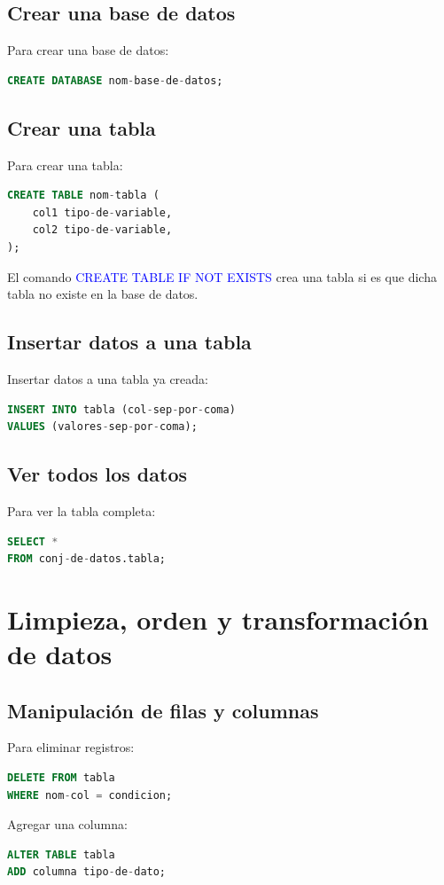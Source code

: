 \documentclass[a4paper, 12pt]{book}
\begin{document}
\subsection{Crear una base de datos}
Para crear una base de datos:
\begin{lstlisting}[language=SQL]
CREATE DATABASE nom-base-de-datos;
\end{lstlisting}
\subsection{Crear una tabla}
Para crear una tabla:
\begin{lstlisting}[language=SQL]
CREATE TABLE nom-tabla (
    col1 tipo-de-variable,
    col2 tipo-de-variable,
);
\end{lstlisting}
El comando \textcolor{blue}{CREATE TABLE IF NOT EXISTS} crea una tabla si es que dicha tabla no existe en la base de datos.
\subsection{Insertar datos a una tabla}
Insertar datos a una tabla ya creada:
\begin{lstlisting}[language=SQL]
INSERT INTO tabla (col-sep-por-coma)
VALUES (valores-sep-por-coma);
\end{lstlisting}
\subsection{Ver todos los datos}
Para ver la tabla completa:
\begin{lstlisting}[language=SQL]
SELECT *
FROM conj-de-datos.tabla;
\end{lstlisting}
\section{Limpieza, orden y transformación de datos}
\subsection{Manipulación de filas y columnas}
Para eliminar registros:
\begin{lstlisting}[language=SQL]
DELETE FROM tabla
WHERE nom-col = condicion;
\end{lstlisting}


Agregar una columna:
\begin{lstlisting}[language=SQL]
ALTER TABLE tabla
ADD columna tipo-de-dato;
\end{lstlisting}
\end{document}
